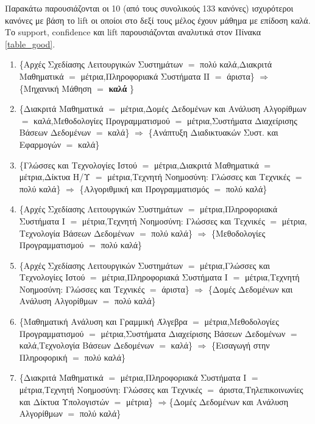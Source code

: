 \documentclass[12pt,a4paper,final]{article}
\begin{document}
\begin{landscape}
Παρακάτω παρουσιάζονται οι 10 (από τους συνολικούς 133 κανόνες) ισχυρότεροι κανόνες με βάση το \foreignlanguage{english}{lift} οι οποίοι στο δεξί τους μέλος έχουν μάθημα με επίδοση καλά. Το \foreignlanguage{english}{support, confidence} και \foreignlanguage{english}{lift} παρουσιάζονται αναλυτικά στον Πίνακα \ref{table_good}.
   
\begin{enumerate}

    \item \{Αρχές Σχεδίασης Λειτουργικών Συστημάτων $=$ πολύ καλά,Διακριτά Μαθηματικά $=$ μέτρια,Πληροφοριακά Συστήματα ΙΙ $=$ άριστα\} $\Rightarrow$ \{Μηχανική Μάθηση $=$ \textbf{καλά} \}
    
    \item \{Διακριτά Μαθηματικά $=$ μέτρια,Δομές Δεδομένων και Ανάλυση Αλγορίθμων $=$ καλά,Μεθοδολογίες Προγραμματισμού $=$ μέτρια,Συστήματα Διαχείρισης Βάσεων Δεδομένων $=$ καλά\} $\Rightarrow$ \{Ανάπτυξη Διαδικτυακών Συστ. και Εφαρμογών $=$ καλά\}


    \item \{Γλώσσες και Τεχνολογίες Ιστού $=$ μέτρια,Διακριτά Μαθηματικά $=$ μέτρια,Δίκτυα Η/Υ $=$ μέτρια,Τεχνητή Νοημοσύνη: Γλώσσες και Τεχνικές $=$ πολύ καλά\} $\Rightarrow$ \{Αλγοριθμική και Προγραμματισμός $=$ πολύ καλά\}


    \item \{Αρχές Σχεδίασης Λειτουργικών Συστημάτων $=$ μέτρια,Πληροφοριακά Συστήματα Ι $=$ μέτρια,Τεχνητή Νοημοσύνη: Γλώσσες και Τεχνικές $=$ μέτρια,
Τεχνολογία Βάσεων Δεδομένων $=$ πολύ καλά\} $\Rightarrow$ \{Μεθοδολογίες Προγραμματισμού $=$ πολύ καλά\}


    \item \{Αρχές Σχεδίασης Λειτουργικών Συστημάτων $=$ μέτρια,Γλώσσες και Τεχνολογίες Ιστού $=$ μέτρια,Πληροφοριακά Συστήματα Ι $=$ μέτρια,Τεχνητή Νοημοσύνη: Γλώσσες και Τεχνικές $=$ άριστα\} $\Rightarrow$ \{Δομές Δεδομένων και Ανάλυση Αλγορίθμων $=$ πολύ καλά\}


    \item \{Μαθηματική Ανάλυση και Γραμμική Άλγεβρα $=$ μέτρια,Μεθοδολογίες Προγραμματισμού $=$ μέτρια,Συστήματα Διαχείρισης Βάσεων Δεδομένων $=$ καλά,Τεχνολογία Βάσεων Δεδομένων $=$ καλά\}  $\Rightarrow$ \{Εισαγωγή στην Πληροφορική $=$ πολύ καλά\}


    \item \{Διακριτά Μαθηματικά $=$ μέτρια,Πληροφοριακά Συστήματα Ι $=$ μέτρια,Τεχνητή Νοημοσύνη: Γλώσσες και Τεχνικές $=$ άριστα,Τηλεπικοινωνίες και Δίκτυα Υπολογιστών $=$ μέτρια\} $\Rightarrow$\{Δομές Δεδομένων και Ανάλυση Αλγορίθμων $=$ πολύ καλά\}



\end{enumerate}
\end{landscape}
\end{document}
